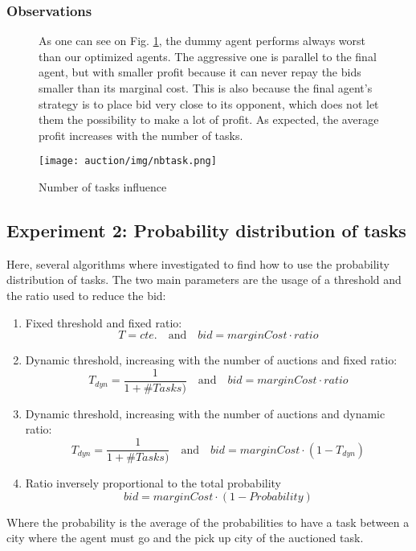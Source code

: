 \documentclass[11pt]{article}
\begin{document}
\subsubsection{Observations}

\begin{figure}[H]
	\centering
	\begin{minipage}{0.49\linewidth}
        As one can see on Fig. \ref{fig:nbtask}, the dummy agent performs always worst than our optimized agents. The aggressive one is parallel to the final agent, but with smaller profit because it can never repay the bids smaller than its marginal cost. This is also because the final agent's strategy is to place bid very close to its opponent, which does not let them the possibility to make a lot of profit. As expected, the average profit increases with the number of tasks.
	\end{minipage}
	\begin{minipage}{0.49\linewidth}
    	\centering
    	\texttt{[image: auction/img/nbtask.png]}
    	\caption{Number of tasks influence}
        \label{fig:nbtask}
	\end{minipage}
\end{figure}

\subsection{Experiment 2: Probability distribution of tasks}
Here, several algorithms where investigated to find how to use the probability distribution of tasks. The two main parameters are the usage of a threshold and the ratio used to reduce the bid:
\begin{enumerate}
    \item Fixed threshold and fixed ratio: $$T = cte. \quad \text{and} \quad bid = marginCost \cdot ratio$$
    \item Dynamic threshold, increasing with the number of auctions and fixed ratio: $$T_{dyn} = \frac{1}{1+\#Tasks)} \quad \text{and} \quad bid = marginCost \cdot ratio$$
    \item Dynamic threshold, increasing with the number of auctions and dynamic ratio: $$T_{dyn} = \frac{1}{1+\#Tasks)} \quad \text{and} \quad bid = marginCost \cdot (1-T_{dyn})$$
    \item Ratio inversely proportional to the total probability $$bid = marginCost \cdot (1-Probability)$$
\end{enumerate}
Where the probability is the average of the probabilities to have a task between a city where the agent must go and the pick up city of the auctioned task.
\end{document}

